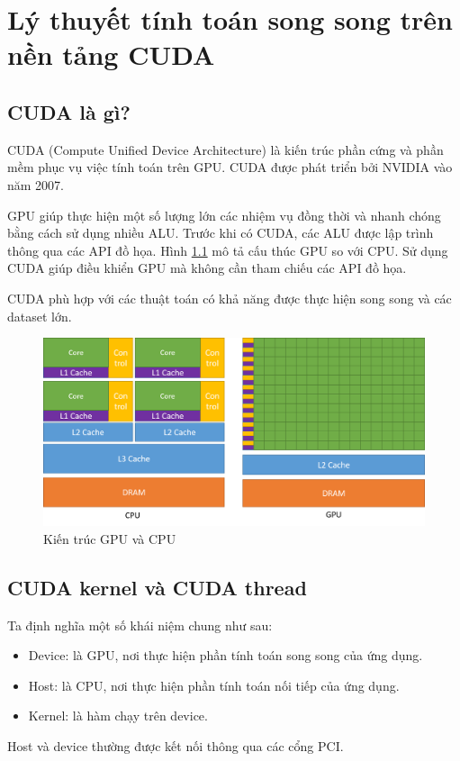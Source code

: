 \documentclass[../../main.tex]{subfiles}
\begin{document}
\graphicspath{{img/}{02_theory/img/}}

\chapter{Lý thuyết tính toán song song trên nền tảng CUDA}

\section{CUDA là gì?}
CUDA (Compute Unified Device Architecture) là kiến trúc phần cứng và phần mềm phục vụ việc tính toán trên GPU. CUDA được phát triển bởi NVIDIA vào năm 2007.

GPU giúp thực hiện một số lượng lớn các nhiệm vụ đồng thời và nhanh chóng bằng cách sử dụng nhiều ALU. Trước khi có CUDA, các ALU được lập trình thông qua các API đồ họa. Hình \ref{fig:gpu_vs_cpu} mô tả cấu thúc GPU so với CPU. Sử dụng CUDA giúp điều khiển GPU mà không cần tham chiếu các API đồ họa. 

CUDA phù hợp với các thuật toán có khả năng được thực hiện song song và các dataset lớn.

\begin{figure}[H]
    \begin{center}
        \includegraphics[scale=0.5]{gpu-devotes-more-transistors-to-data-processing.png}
    \end{center}
    \caption{Kiến trúc GPU và CPU}
    \label{fig:gpu_vs_cpu}
\end{figure}

\section{CUDA kernel và CUDA thread}
Ta định nghĩa một số khái niệm chung như sau:
\begin{itemize}
    \item Device: là GPU, nơi thực hiện phần tính toán song song của ứng dụng.
    \item Host: là CPU, nơi thực hiện phần tính toán nối tiếp của ứng dụng.
    \item Kernel: là hàm chạy trên device.
\end{itemize}
Host và device thường được kết nối thông qua các cổng PCI.
\end{document}
